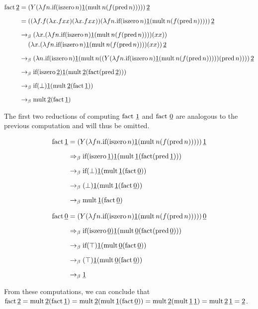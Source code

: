 \begin{align*}
\FACT\,\TWO
&= (\Y(\LAM{f n}{\IF(\ISZERO\, n)\ONE(\MULT\, n(f(\PRED\, n)))}))\,\TWO \\[6pt]
&= ((\LAM{f}{f(\LAM{x}{fxx})(\LAM{x}{fxx})})(\LAM{f n}{\IF(\ISZERO\, n)\ONE(\MULT\, n(f(\PRED\, n)))}))\,\TWO \\[6pt]
&\rightarrow_\beta (\LAM{x}{(\LAM{f n}{\IF(\ISZERO\, n)\ONE(\MULT\, n(f(\PRED\, n)))}) (x x)})\\&\quad~ (\LAM{x}{(\LAM{f n}{\IF(\ISZERO\, n)\ONE(\MULT\, n(f(\PRED\, n)))}) (x x)})\,\TWO \\[6pt]
&\rightarrow_\beta (\LAM{n}{\IF(\ISZERO\, n)\ONE(\MULT\, n((Y(\LAM{f n}{\IF(\ISZERO\, n)\ONE(\MULT\, n(f(\PRED\, n)))}))(\PRED\, n)))})\,\TWO \\[6pt]
&\rightarrow_\beta \IF(\ISZERO\,\TWO)\ONE(\MULT\,\TWO(\FACT(\PRED\,\TWO))) \\[6pt]
&\rightarrow_\beta \IF(\bot)\ONE(\MULT\,\TWO(\FACT\,\ONE)) \\[6pt]
&\rightarrow_\beta \MULT\,\TWO(\FACT\,\ONE)
\end{align*}

The first two reductions of computing $\FACT~\ONE$ and $\FACT~\ZERO$ are
analogous to the previous computation and will thus be omitted.

\begin{align*}
\FACT\,\ONE
&= (Y(\LAM{f n}{\IF(\ISZERO\, n)\ONE(\MULT\, n(f(\PRED\, n)))}))\,\ONE \\[6pt]
&\Rightarrow_\beta \IF(\ISZERO\,\ONE)\ONE(\MULT\,\ONE(\FACT(\PRED\,\ONE))) \\[6pt]
&\rightarrow_\beta \IF(\bot)\ONE(\MULT\,\ONE(\FACT\,\ZERO)) \\[6pt]
&\rightarrow_\beta (\bot)\ONE(\MULT\,\ONE(\FACT\,\ZERO)) \\[6pt]
&\rightarrow_\beta \MULT\,\ONE(\FACT\,\ZERO)
\end{align*}

\begin{align*}
\FACT\,\ZERO
&= (Y(\LAM{f n}{\IF(\ISZERO\, n)\ONE(\MULT\, n(f(\PRED\, n)))}))\,\ZERO \\[6pt]
&\Rightarrow_\beta \IF(\ISZERO\,\ZERO)\ONE(\MULT\,\ZERO(\FACT(\PRED\,\ZERO))) \\[6pt]
&\rightarrow_\beta \IF(\top)\ONE(\MULT\,\ZERO(\FACT\,\ZERO)) \\[6pt]
&\rightarrow_\beta (\top)\ONE(\MULT\,\ZERO(\FACT\,\ZERO)) \\[6pt]
&\rightarrow_\beta \ONE
\end{align*}

From these computations, we can conclude that $\FACT\,\TWO = \MULT\,\TWO(\FACT\,\ONE) = \MULT\,\TWO(\MULT\,\ONE(\FACT\,\ZERO)) = \MULT\,\TWO(\MULT\,\ONE\,\ONE) = \MULT\,\TWO\,\ONE = \TWO$.
